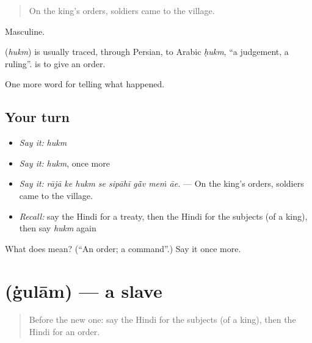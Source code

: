 \begin{quote}
On the king's orders, soldiers came to the village.
\end{quote}

Masculine.

\begin{cousinweb}
\textbf{} (\emph{hukm}) is usually traced, through Persian, to Arabic \emph{ḥukm}, \textquotedblleft{}a judgement, a ruling\textquotedblright{}. \textbf{ } is to give an order.
\end{cousinweb}

\begin{grammarlens}[title={What you've built}]
One more word for telling what happened.
\end{grammarlens}

\subsection*{Your turn}
\begin{itemize}
\raggedright
  \item \emph{Say it:} \emph{hukm}
  \item \emph{Say it:} \emph{hukm}, once more
  \item \emph{Say it:} \emph{rājā ke hukm se sipāhī gā̃v meṁ āe.} — On the king's orders, soldiers came to the village.
  \item \emph{Recall:} say the Hindi for a treaty, then the Hindi for the subjects (of a king), then say \emph{hukm} again
\end{itemize}

\begin{tcolorbox}[breakable,colback=teal!4,colframe=teal!35!black,title={Before you move on}]
What does  mean? (\textquotedblleft{}An order; a command\textquotedblright{}.) Say it once more.
\end{tcolorbox}
\section[\texorpdfstring{\hi{ग़ुलाम} (ġulām)}{ग़ुलाम (ġulām)}]{ (ġulām) — a slave}

\label{lesson:HI-C324-gulam}



\begin{quote}
Before the new one: say the Hindi for the subjects (of a king), then the Hindi for an order.
\end{quote}

